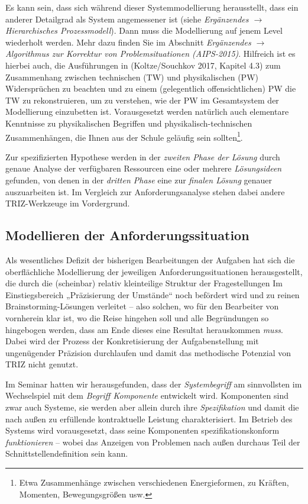\documentclass[11pt,a4paper]{article}
\begin{document}
Es kann sein, dass sich während dieser Systemmodellierung herausstellt, dass
ein anderer Detailgrad als System angemessener ist (siehe \emph{Ergänzendes
  $\to$ Hierarchisches Prozessmodell}).  Dann muss die Modellierung auf jenem
Level wiederholt werden. Mehr dazu finden Sie im Abschnitt \emph{Ergänzendes
  $\to$ Algorithmus zur Korrektur von Problemsituationen (AIPS-2015)}.
Hilfreich ist es hierbei auch, die Ausführungen in (Koltze/Souchkov 2017,
Kapitel 4.3) zum Zusammenhang zwischen technischen (TW) und physikalischen
(PW) Widersprüchen zu beachten und zu einem (gelegentlich offensichtlichen) PW
die TW zu rekonstruieren, um zu verstehen, wie der PW im Gesamtsystem der
Modellierung einzubetten ist.  Vorausgesetzt werden natürlich auch elementare
Kenntnisse zu physikalischen Begriffen und physikalisch-technischen
Zusammenhängen, die Ihnen aus der Schule geläufig sein sollten\footnote{Etwa
  Zusammenhänge zwischen verschiedenen Energieformen, zu Kräften, Momenten,
  Bewegungsgrößen usw.}.

Zur spezifizierten Hypothese werden in der \emph{zweiten Phase der Lösung}
durch genaue Analyse der verfügbaren Ressourcen eine oder mehrere
\emph{Lösungsideen} gefunden, von denen in der \emph{dritten Phase} eine zur
\emph{finalen Lösung} genauer auszuarbeiten ist.  Im Vergleich zur
Anforderungsanalyse stehen dabei andere TRIZ-Werkzeuge im Vordergrund.

\subsection{Modellieren der Anforderungssituation}

Als wesentliches Defizit der bisherigen Bearbeitungen der Aufgaben hat sich
die oberflächliche Modellierung der jeweiligen Anforderungssituationen
herausgestellt, die durch die (scheinbar) relativ kleinteilige Struktur der
Fragestellungen Im Einstiegsbereich „Präzisierung der Umstände“ noch befördert
wird und zu reinen Brainstorming-Lösungen verleitet -- also solchen, wo für
den Bearbeiter von vornherein klar ist, wo die Reise hingehen soll und alle
Begründungen so hingebogen werden, dass am Ende dieses eine Resultat
herauskommen \emph{muss}.  Dabei wird der Prozess der Konkretisierung der
Aufgabenstellung mit ungenügender Präzision durchlaufen und damit das
methodische Potenzial von TRIZ nicht genutzt.

Im Seminar hatten wir herausgefunden, dass der \emph{Systembegriff} am
sinnvollsten im Wechselspiel mit dem \emph{Begriff Komponente} entwickelt
wird.  Komponenten sind zwar auch Systeme, sie werden aber allein durch ihre
\emph{Spezifikation} und damit die nach außen zu erfüllende kontraktuelle
Leistung charakterisiert.  Im Betrieb des Systems wird vorausgesetzt, dass
seine Komponenten spezifikationskonform \emph{funktionieren} -- wobei das
Anzeigen von Problemen nach außen durchaus Teil der Schnittstellendefinition
sein kann.
\end{document}
